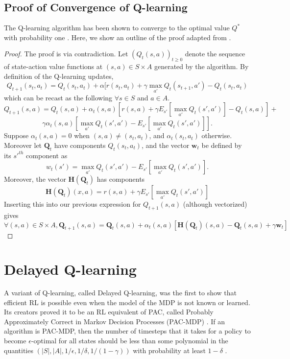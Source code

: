 \documentclass{article} %
\begin{document}
\subsection{Proof of Convergence of Q-learning}
The Q-learning algorithm has been shown to converge to the optimal value $Q^*$ with probability one \cite{mohri}.  Here, we show an outline of the proof adapted from \cite{mohri}.  
\begin{proof}
The proof is via contradiction. Let $(Q_t(s,a))_{t\geq 0}$ denote the sequence of state-action value functions at $(s,a) \in S \times A$ generated by the algorithm.  By definition of the Q-learning updates,
$$
Q_{t+1}(s_t,a_t) = Q_t(s_t,a_t) + \alpha[r(s_t,a_t) + \gamma \max_{a'}Q_t(s_{t+1},a') - Q_t(s_t,a_t)
$$
which can be recast as the following $\forall s \in S$ and $a \in A$.
$$
Q_{t+1}(s,a) = Q_t(s,a) + \alpha_t(s,a)[r(s,a) + \gamma E_{s'}[\max_{a'}Q_t(s',a')] - Q_t(s,a)] +
$$
$$
\gamma\alpha_t(s,a)[\max_{a'}Q_t(s',a') - E_{s'}[\max_{a'}Q_t(s',a')] ].
$$
Suppose $\alpha_t(s,a) = 0$ when $(s,a) \neq (s_t,a_t)$, and $\alpha_t(s_t,a_t)$ otherwise. Moreover let $\textbf{Q}_t$ have components $Q_t(s_t,a_t)$, and the vector $\textbf{w}_t$ be defined by its $s'^{th}$ component as
$$
w_t(s') = \max_{a'}Q_t(s',a') - E_{s'} [\max_{a'}Q_t(s',a') ].
$$
Moreover, the vector $\textbf{H}(\textbf{Q}_t)$ has components
$$
\textbf{H}(\textbf{Q}_t)(x,a) = r(s,a) + \gamma E_{s'}[\max_{a'}Q_t(s',a') ]
$$
Inserting this into our previous expression for $Q_{t+1}(s,a)$ (although vectorized) gives
$$
\forall (s,a) \in S \times A, \textbf{Q}_{t+1}(s,a) = \textbf{Q}_t(s,a) + \alpha_t(s,a)[\textbf{H}(\textbf{Q}_t)(s,a) - \textbf{Q}_t(s,a) + \gamma\textbf{w}_t]
$$


\end{proof}



\section{Delayed Q-learning}
A variant of Q-learning, called Delayed Q-learning, was the first to show that efficient RL is possible even when the model of the MDP is not known or learned.  Its creators proved it to be an RL equivalent of PAC, called Probably Approximately Correct in Markov Decision Processes (PAC-MDP) \cite{strehl_pac_2006}.  If an algorithm is PAC-MDP, then the number of timesteps that it takes for a policy to become $\epsilon$-optimal for all states should be less than some polynomial in the quantities $(\left|S\right|,\left|A\right|,1/\epsilon,1/\delta,1/(1-\gamma))$ with probability at least $1-\delta$ \cite{kakade}.
\end{document}
